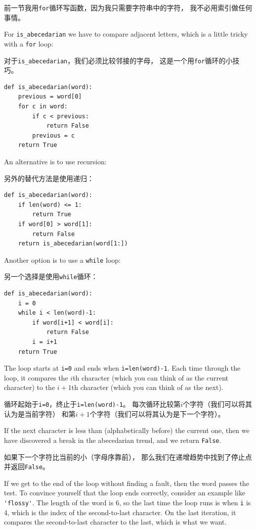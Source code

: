 \documentclass[10pt]{book}
\begin{document}
\begin{CJK}{UTF8}{gbsn}
前一节我用{\tt for}循环写函数，因为我只需要字符串中的字符，
我不必用索引做任何事情。

For \verb"is_abecedarian" we have to compare adjacent letters,
which is a little tricky with a {\tt for} loop:

对于\verb"is_abecedarian"，我们必须比较邻接的字母，
这是一个用{\tt for}循环的小技巧。

\begin{verbatim}
def is_abecedarian(word):
    previous = word[0]
    for c in word:
        if c < previous:
            return False
        previous = c
    return True
\end{verbatim}


An alternative is to use recursion:

另外的替代方法是使用递归：

\begin{verbatim}
def is_abecedarian(word):
    if len(word) <= 1:
        return True
    if word[0] > word[1]:
        return False
    return is_abecedarian(word[1:])
\end{verbatim}

Another option is to use a {\tt while} loop:

另一个选择是使用{\tt while}循环：

\begin{verbatim}
def is_abecedarian(word):
    i = 0
    while i < len(word)-1:
        if word[i+1] < word[i]:
            return False
        i = i+1
    return True
\end{verbatim}
%
The loop starts at {\tt i=0} and ends when {\tt i=len(word)-1}.  Each
time through the loop, it compares the $i$th character (which you can
think of as the current character) to the $i+1$th character (which you
can think of as the next).

循环起始于{\tt i=0}，终止于{\tt i=len(word)-1}。
每次循环比较第$i$个字符（我们可以将其认为是当前字符）
和第$i+1$个字符（我们可以将其认为是下一个字符）。

If the next character is less than (alphabetically before) the current
one, then we have discovered a break in the abecedarian trend, and
we return {\tt False}.

如果下一个字符比当前的小（字母序靠前），
那么我们在递增趋势中找到了停止点并返回{\tt False}。

If we get to the end of the loop without finding a fault, then the
word passes the test.  To convince yourself that the loop ends
correctly, consider an example like \verb"'flossy'".  The
length of the word is 6, so
the last time the loop runs is when {\tt i} is 4, which is the
index of the second-to-last character.  On the last iteration,
it compares the second-to-last character to the last, which is
what we want.


\end{CJK}
\end{document}
